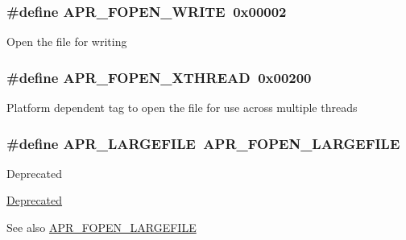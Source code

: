 \subsubsection[{\texorpdfstring{A\+P\+R\+\_\+\+F\+O\+P\+E\+N\+\_\+\+W\+R\+I\+TE}{APR_FOPEN_WRITE}}]{\setlength{\rightskip}{0pt plus 5cm}\#define A\+P\+R\+\_\+\+F\+O\+P\+E\+N\+\_\+\+W\+R\+I\+TE~0x00002}\hypertarget{group__apr__file__open__flags_gac598bb95fc9476b0bf2ed0b1c308842c}{}\label{group__apr__file__open__flags_gac598bb95fc9476b0bf2ed0b1c308842c}
Open the file for writing 
\subsubsection[{\texorpdfstring{A\+P\+R\+\_\+\+F\+O\+P\+E\+N\+\_\+\+X\+T\+H\+R\+E\+AD}{APR_FOPEN_XTHREAD}}]{\setlength{\rightskip}{0pt plus 5cm}\#define A\+P\+R\+\_\+\+F\+O\+P\+E\+N\+\_\+\+X\+T\+H\+R\+E\+AD~0x00200}\hypertarget{group__apr__file__open__flags_ga435cd9b2604b11796779c23ffa00a3dd}{}\label{group__apr__file__open__flags_ga435cd9b2604b11796779c23ffa00a3dd}
Platform dependent tag to open the file for use across multiple threads 
\subsubsection[{\texorpdfstring{A\+P\+R\+\_\+\+L\+A\+R\+G\+E\+F\+I\+LE}{APR_LARGEFILE}}]{\setlength{\rightskip}{0pt plus 5cm}\#define A\+P\+R\+\_\+\+L\+A\+R\+G\+E\+F\+I\+LE~{\bf A\+P\+R\+\_\+\+F\+O\+P\+E\+N\+\_\+\+L\+A\+R\+G\+E\+F\+I\+LE}}\hypertarget{group__apr__file__open__flags_gaafa04fd4ec71910a5d7af1c7f5596bad}{}\label{group__apr__file__open__flags_gaafa04fd4ec71910a5d7af1c7f5596bad}
\begin{DoxyRefDesc}{Deprecated}
\item[\hyperlink{deprecated__deprecated000037}{Deprecated}]\end{DoxyRefDesc}
\begin{DoxySeeAlso}{See also}
\hyperlink{group__apr__file__open__flags_gaf6cfaa4789e6264afd186235f0adbc22}{A\+P\+R\+\_\+\+F\+O\+P\+E\+N\+\_\+\+L\+A\+R\+G\+E\+F\+I\+LE} 
\end{DoxySeeAlso}
